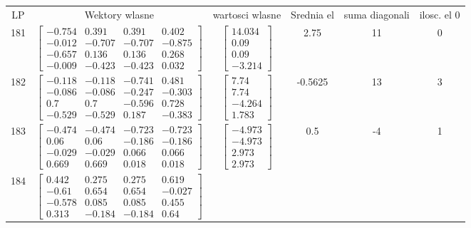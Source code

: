 \documentclass[a4paper,12pt]{article}
\begin{document}
\bgroup {} \vspace{0.2in} \begin{tabular}{c c c c c c}
LP &Wektory wlasne & wartosci wlasne & Srednia el & suma diagonali & ilosc. el 0\\
181
&
$\begin{bmatrix} -0.754 & 0.391 & 0.391 & 0.402 \\ -0.012 & -0.707 & -0.707 & -0.875 \\ -0.657 & 0.136 & 0.136 & 0.268 \\ -0.009 & -0.423 & -0.423 & 0.032 \end{bmatrix}$
&
$\begin{bmatrix} 14.034 \\ 0.09 \\ 0.09 \\ -3.214 \end{bmatrix}$
&
2.75
&
11
&
0
\\
182
&
$\begin{bmatrix} -0.118 & -0.118 & -0.741 & 0.481 \\ -0.086 & -0.086 & -0.247 & -0.303 \\ 0.7 & 0.7 & -0.596 & 0.728 \\ -0.529 & -0.529 & 0.187 & -0.383 \end{bmatrix}$
&
$\begin{bmatrix} 7.74 \\ 7.74 \\ -4.264 \\ 1.783 \end{bmatrix}$
&
-0.5625
&
13
&
3
\\
183
&
$\begin{bmatrix} -0.474 & -0.474 & -0.723 & -0.723 \\ 0.06 & 0.06 & -0.186 & -0.186 \\ -0.029 & -0.029 & 0.066 & 0.066 \\ 0.669 & 0.669 & 0.018 & 0.018 \end{bmatrix}$
&
$\begin{bmatrix} -4.973 \\ -4.973 \\ 2.973 \\ 2.973 \end{bmatrix}$
&
0.5
&
-4
&
1
\\
184
&
$\begin{bmatrix} 0.442 & 0.275 & 0.275 & 0.619 \\ -0.61 & 0.654 & 0.654 & -0.027 \\ -0.578 & 0.085 & 0.085 & 0.455 \\ 0.313 & -0.184 & -0.184 & 0.64 \end{bmatrix}$

\end{tabular}
\end{document}
